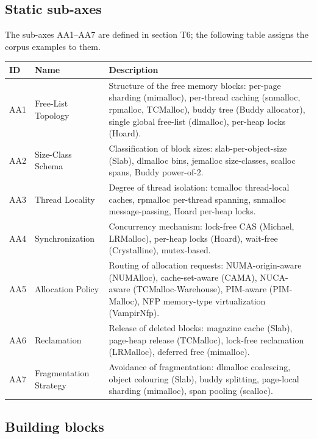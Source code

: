 \subsection*{Static sub-axes}

The sub-axes AA1--AA7 are defined in section T6; the following table assigns the corpus examples to them.

\begin{scriptsize}
\begin{longtable}{@{}>{\raggedright\arraybackslash}p{1.8cm} >{\raggedright\arraybackslash}p{3.2cm} >{\raggedright\arraybackslash}p{8.5cm}@{}}
\toprule
ID & Name & Description \\
\midrule
\endhead%
AA1 & Free-List Topology & Structure of the free memory blocks: per-page sharding (mimalloc), per-thread caching (snmalloc, rpmalloc, TCMalloc), buddy tree (Buddy allocator), single global free-list (dlmalloc), per-heap locks (Hoard). \\
AA2 & Size-Class Schema & Classification of block sizes: slab-per-object-size (Slab), dlmalloc bins, jemalloc size-classes, scalloc spans, Buddy power-of-2. \\
AA3 & Thread Locality & Degree of thread isolation: tcmalloc thread-local caches, rpmalloc per-thread spanning, snmalloc message-passing, Hoard per-heap locks. \\
AA4 & Synchronization & Concurrency mechanism: lock-free CAS (Michael, LRMalloc), per-heap locks (Hoard), wait-free (Crystalline), mutex-based. \\
AA5 & Allocation Policy & Routing of allocation requests: NUMA-origin-aware (NUMAlloc), cache-set-aware (CAMA), NUCA-aware (TCMalloc-Warehouse), PIM-aware (PIM-Malloc), NFP memory-type virtualization (Vampir\allowbreak{}Nfp). \\
AA6 & Reclamation & Release of deleted blocks: magazine cache (Slab), page-heap release (TCMalloc), lock-free reclamation (LRMalloc), deferred free (mimalloc). \\
AA7 & Fragmentation Strategy & Avoidance of fragmentation: dlmalloc coalescing, object colouring (Slab), buddy splitting, page-local sharding (mimalloc), span pooling (scalloc). \\
\bottomrule
\end{longtable}
\end{scriptsize}

\subsection*{Building blocks}

